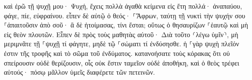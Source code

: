 \documentclass{openreader}
\begin{document}
καὶ ἐρῶ τῇ ψυχῇ μου· Ψυχή, ἔχεις πολλὰ ἀγαθὰ κείμενα εἰς ἔτη πολλά· ἀναπαύου, φάγε, πίε, εὐφραίνου. 
εἶπεν δὲ αὐτῷ ὁ θεός· ⸀Ἄφρων, ταύτῃ τῇ νυκτὶ τὴν ψυχήν σου ⸀ἀπαιτοῦσιν ἀπὸ σοῦ· ἃ δὲ ἡτοίμασας, τίνι ἔσται; 
οὕτως ὁ θησαυρίζων ⸀ἑαυτῷ καὶ μὴ εἰς θεὸν πλουτῶν. 
Εἶπεν δὲ πρὸς τοὺς μαθητὰς αὐτοῦ· Διὰ τοῦτο ⸂λέγω ὑμῖν⸃, μὴ μεριμνᾶτε τῇ ⸀ψυχῇ τί φάγητε, μηδὲ τῷ ⸀σώματι τί ἐνδύσησθε. 
ἡ ⸀γὰρ ψυχὴ πλεῖόν ἐστιν τῆς τροφῆς καὶ τὸ σῶμα τοῦ ἐνδύματος. 
κατανοήσατε τοὺς κόρακας ὅτι οὐ σπείρουσιν οὐδὲ θερίζουσιν, οἷς οὐκ ἔστιν ταμεῖον οὐδὲ ἀποθήκη, καὶ ὁ θεὸς τρέφει αὐτούς· πόσῳ μᾶλλον ὑμεῖς διαφέρετε τῶν πετεινῶν. 
\end{document}
